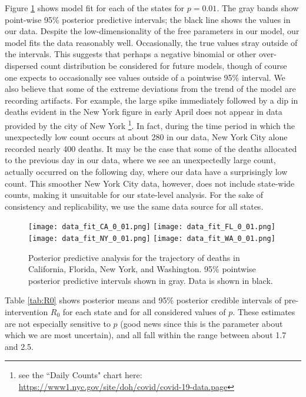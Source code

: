 \documentclass[11pt]{article}
\theoremstyle{plain}
\newcommand{\1}{\mathbf 1}
\begin{document}
Figure \ref{fig:fit} shows model fit for each of the states for  $p = 0.01$. The gray bands show point-wise 95\% posterior predictive intervals; the black line shows the values in our data. Despite the low-dimensionality of the free parameters in our model, our model fits the data reasonably well. Occasionally, the true values stray outside of the intervals. This suggests that perhaps a negative binomial or other over-dispersed count distribution be considered for future models, though of course one expects to occasionally see values outside of a pointwise 95\% interval. We also believe that some of the extreme deviations from the trend of the model are recording artifacts. For example, the large spike immediately followed by a dip in deaths evident in the New York figure in early April does not appear in data provided by the city of New York \footnote{see the ``Daily Counts" chart here: \url{https://www1.nyc.gov/site/doh/covid/covid-19-data.page}}. In fact, during the time period in which the unexpectedly low count occurs at about 280 in our data, New York City alone recorded nearly 400 deaths. It may be the case that some of the deaths allocated to the previous day in our data, where we see an unexpectedly large count, actually occurred on the following day, where our data have a surprisingly low count. This smoother New York City data, however, does not include state-wide counts, making it unsuitable for our state-level analysis. For the sake of consistency and replicability, we use the same data source for all states. 

\begin{figure}[h]
\texttt{[image: data\_fit\_CA\_0\_01.png]}
\texttt{[image: data\_fit\_FL\_0\_01.png]}
\texttt{[image: data\_fit\_NY\_0\_01.png]}
\texttt{[image: data\_fit\_WA\_0\_01.png]}
\caption{Posterior predictive analysis  for the trajectory of deaths in California, Florida, New York, and Washington. 95\% pointwise posterior predictive intervals shown in gray. Data is shown in black. \label{fig:fit}}
\end{figure}

Table \ref{tab:R0} shows posterior means and 95\% posterior credible intervals of pre-intervention $R_0$ for each state and for all considered values of $p$. These estimates are not especially sensitive to $p$ (good news since this is the parameter about which we are most uncertain), and all fall within the range between about 1.7 and 2.5.
\end{document}
